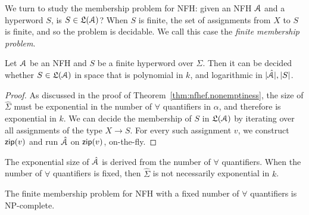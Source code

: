 We turn to study the membership problem for NFH: given an NFH $\mathcal{A}$ and a hyperword $S$, is $S\in\mathfrak{L}(\mathcal{A})$? 
When $S$ is finite, the set of assignments from $X$ to $S$ is finite, and so the problem is decidable. We call this case the {\em finite membership problem}. 

\begin{theorem}\label{thm:nfh.membership.finite}
Let $\mathcal{A}$ be an NFH and $S$ be a finite hyperword over $\Sigma$. Then it can be decided whether $S\in \mathfrak{L}(\mathcal{A})$ in space that is polynomial in $k$, and logarithmic in $|\hat{\mathcal{A}}|, |S|$.
\end{theorem}

\begin{proof}
As discussed in the proof of Theorem~\ref{thm:nfhef.nonemptiness}, the size of $\hat\Sigma$ must be exponential in the number of $\forall$ quantifiers in $\alpha$, and therefore is exponential in $k$. 
We can decide the membership of $S$ in $\mathfrak{L}(\mathcal{A})$ by iterating over all assignments of the type $X\rightarrow S$. For every such assignment $v$, we construct $\mathsf{zip}(v)$ and run $\hat{\mathcal{A}}$ on $\mathsf{zip}(v)$, on-the-fly. 
\end{proof}

The exponential size of $\hat{\mathcal{A}}$ is derived from the number of $\forall$ quantifiers. When the number of $\forall$ quantifiers is fixed, then $\hat\Sigma$ is not necessarily exponential in $k$. 

\begin{theorem}
The finite membership problem for NFH with a fixed number of $\forall$ quantifiers is NP-complete.
\end{theorem}

